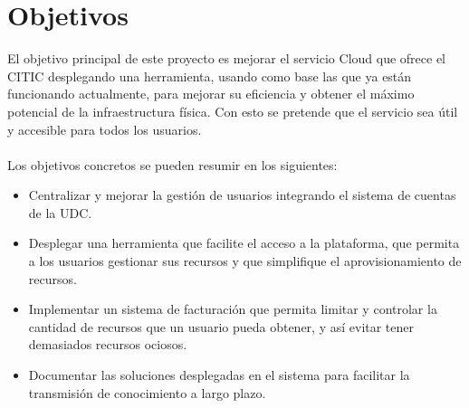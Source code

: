 \section{Objetivos}
El objetivo principal de este proyecto es mejorar el servicio Cloud que ofrece el CITIC desplegando una herramienta, usando como base las que ya están funcionando actualmente, para mejorar su eficiencia y obtener el máximo potencial de la infraestructura física. Con esto se pretende que el servicio sea útil y accesible para todos los usuarios.\\\\
Los objetivos concretos se pueden resumir en los siguientes:
\begin{itemize}
    \item Centralizar y mejorar la gestión de usuarios integrando el sistema de cuentas de la UDC.
    \item Desplegar una herramienta que facilite el acceso a la plataforma, que permita a los usuarios gestionar sus recursos y que simplifique el aprovisionamiento de recursos.
    \item Implementar un sistema de facturación que permita limitar y controlar la cantidad de recursos que un usuario pueda obtener, y así evitar tener demasiados recursos ociosos.
    \item Documentar las soluciones desplegadas en el sistema para facilitar la transmisión de conocimiento a largo plazo.
\end{itemize}

